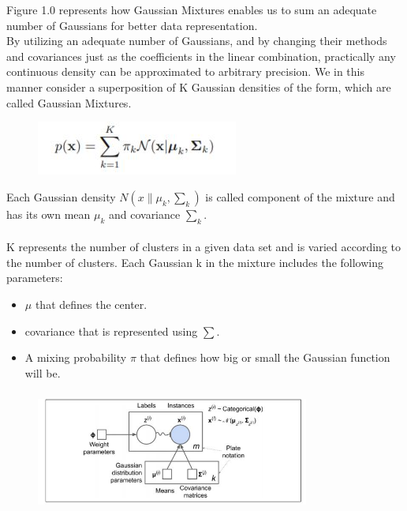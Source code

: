 \documentclass[conference]{IEEEtran}
\begin{document}
Figure 1.0 represents how Gaussian Mixtures enables us to sum an adequate number of Gaussians for better data representation. \\

By utilizing an adequate number of Gaussians, and by changing their methods and covariances just as the coefficients in the linear combination, practically any continuous density can be approximated to arbitrary precision. We in this manner consider a superposition of K Gaussian densities of the form, which are called Gaussian Mixtures.

\begin{figure}[h]
    \centering
    \includegraphics{Equationone.JPG}
    \end{figure}
 
 Each Gaussian density $N(x\|\mu_{k},\sum_k)$ is called component of the mixture and has its own mean $\mu_{k}$ and covariance $\sum_k$.\\
 \\ K represents the number of clusters in a given data set and is varied according to the number of clusters.
 Each Gaussian k in the mixture includes the following parameters:
 \begin{itemize}
 \item $\mu$ that defines the center.
 \item covariance that is represented using $\sum$.
 \item A mixing probability $\pi$ that defines how big or small the Gaussian function will be.
\end{itemize}
 
 
  
  \begin{figure}[h]
    \centering
    \includegraphics[width=9cm,height=4cm]{modelone.JPG}
    \caption{}
    \label{}
    \end{figure}
    
\end{document}
